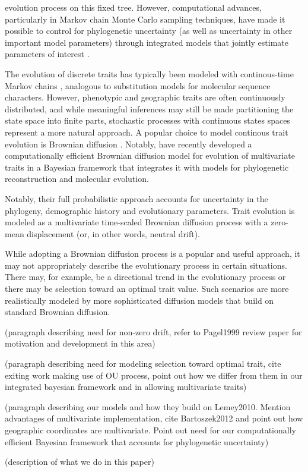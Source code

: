 \documentclass[12pt]{article}
\begin{document}
evolution process on this fixed tree.  
However, computational advances, particularly in Markov chain Monte Carlo sampling techniques,
have made it possible to control for phylogenetic uncertainty (as well as uncertainty in other important model
parameters)
through integrated models that jointly estimate parameters of interest \citep{Huelsenbeck03, Lemey2010}.
\par
The evolution of discrete traits has typically been modeled with continous-time Markov chains \citep{Felsenstein81, Pagel1999, Lemey2009}, 
analogous to substitution models for molecular sequence characters.  However, phenotypic and geographic traits are often continuously distributed,
and while meaningful inferences may still be made partitioning the state space into finite parts, stochastic processes with continuous states spaces
represent a more natural approach.  A popular choice to model continous trait evolution is Brownian diffusion \citep{Felsenstein1985}.
Notably, \citet{Lemey2010} have recently developed a computationally efficient Brownian diffusion model for evolution of multivariate traits in 
a Bayesian framework that integrates it with models for phylogenetic reconstruction and molecular evolution.
\par
Notably, their full probabilistic approach accounts for uncertainty in the phylogeny, demographic history and evolutionary
parameters.  Trait evolution is modeled as a multivariate time-scaled Brownian diffusion process with a zero-mean displacement (or, in other words,
neutral drift).  
\par
While adopting a Brownian diffusion process is a popular and useful approach, it may not appropriately describe the evolutionary 
process in certain situations.  There may, for example, be a directional trend in the evolutionary process or there may be selection toward an optimal
trait value.  Such scenarios are more realistically modeled by more sophisticated diffusion models that build on standard Brownian diffusion.  
\par
(paragraph describing need for non-zero drift, refer to Pagel1999 review paper for motivation and development in this area)
\par
(paragraph describing need for modeling selection toward optimal trait, cite exiting work making use of OU process, point out how we 
differ from them in our integrated bayesian framework and in allowing multivariate traits)
\par
(paragraph describing our models and how they build on Lemey2010.  Mention advantages of multivariate implementation, cite Bartoszek2012 and
point out how geographic coordinates are multivariate.  Point out need for our computationally efficient Bayesian framework that accounts for
phylogenetic uncertainty)
\par
(description of what we do in this paper)
\end{document}
